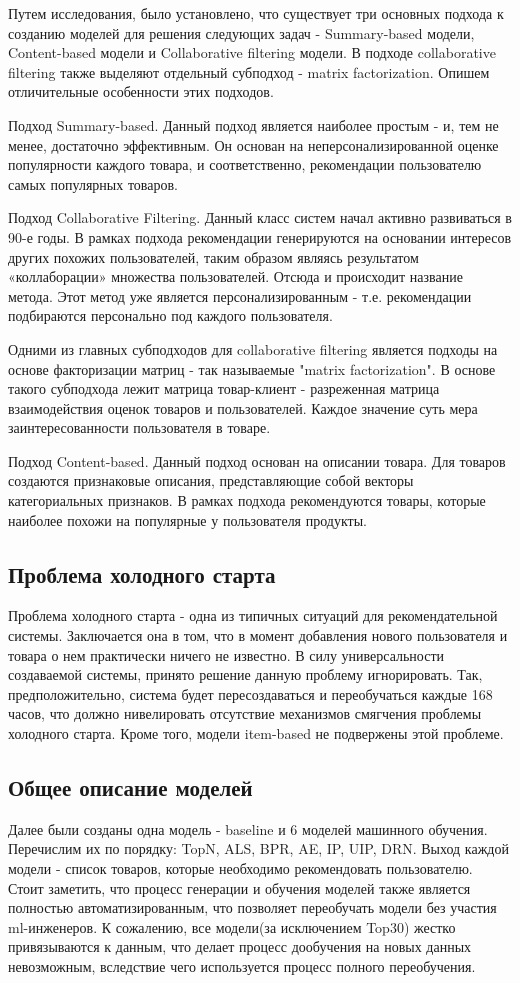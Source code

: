 \documentclass[14pt]{mmcs_article}
\begin{document}
Путем исследования, было установлено, что существует три основных подхода к созданию моделей для решения следующих задач - Summary-based модели, Content-based модели и Collaborative filtering модели. В подходе collaborative filtering также выделяют отдельный субподход - matrix factorization.  Опишем отличительные особенности этих подходов. 

Подход Summary-based. Данный подход является наиболее простым - и, тем не менее, достаточно эффективным. Он основан на неперсонализированной оценке популярности каждого товара, и соответственно, рекомендации пользователю самых популярных товаров.

Подход Collaborative Filtering. Данный класс систем начал активно развиваться в 90-е годы. В рамках подхода рекомендации генерируются на основании интересов других похожих пользователей, таким образом являясь результатом «коллаборации» множества пользователей. Отсюда и  происходит название метода. Этот метод уже является персонализированным - т.е. рекомендации подбираются персонально под каждого пользователя.

Одними из главных субподходов для collaborative filtering является подходы на основе факторизации матриц - так называемые "matrix factorization". В основе такого субподхода лежит матрица товар-клиент - разреженная матрица взаимодействия оценок товаров и пользователей. Каждое значение суть мера заинтересованности пользователя в товаре. 

Подход  Content-based. Данный подход основан на описании товара. Для товаров создаются признаковые описания, представляющие собой векторы категориальных признаков.
В рамках подхода рекомендуются товары, которые наиболее похожи на популярные у пользователя продукты.

\subsection{Проблема холодного старта}
Проблема холодного старта - одна из типичных ситуаций для рекомендательной системы. Заключается она в том, что в момент добавления нового пользователя и товара о нем практически ничего не известно. В силу универсальности создаваемой системы, принято решение данную проблему игнорировать. Так, предположительно, система будет пересоздаваться и переобучаться каждые 168 часов, что должно нивелировать отсутствие механизмов смягчения проблемы холодного старта. Кроме того, модели item-based не подвержены этой проблеме.

\subsection{Общее описание моделей}
Далее были созданы одна модель - baseline и 6 моделей машинного обучения. Перечислим их по порядку: TopN, ALS, BPR, AE, IP, UIP, DRN. Выход каждой модели - список товаров, которые необходимо рекомендовать пользователю. \\
Стоит заметить, что процесс генерации и обучения моделей также является полностью автоматизированным, что позволяет переобучать модели без участия ml-инженеров. К сожалению, все модели(за исключением Top30) жестко привязываются к данным, что делает процесс дообучения на новых данных невозможным, вследствие чего используется процесс полного переобучения.
\end{document}
